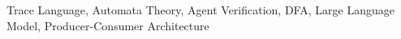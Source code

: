 \begin{keywords}
Trace Language, Automata Theory, Agent Verification, DFA, Large Language Model, Producer-Consumer Architecture
\end{keywords}
